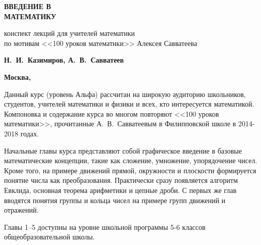 {\thispagestyle{empty}


\begin{flushright}
\quad

\vspace{2cm}

{\fontsize{100pt}{0pt}\bfseries\sffamily ВВЕДЕНИЕ В\\[20pt] МАТЕМАТИКУ}


\vspace{2cm}

{\fontsize{20pt}{22pt}\sffamily конспект лекций для учителей математики\\
по мотивам <<100 уроков математики>> Алексея Савватеева\\[5pt]
}

\vspace{2cm}

{\Large\bfseries\sffamily 	Н.~И.~Казимиров, А.~В.~Савватеев}

\vfill

{\Large\bfseries\sffamily 	Москва, \number\year}
\end{flushright}
}



\markboth{}{}

\clearpage
\renewcommand*\contentsname{\vspace{-20mm}\quad\hfill\Large\bfseries\sffamily\MakeUppercase{Содержание}\vspace{2mm}\textcolor{darkred}{\hrule}\thispagestyle{empty}}
\tableofcontents
 


Данный курс (уровень Альфа) рассчитан на широкую аудиторию школьников, студентов, учителей математики и физики и всех, кто интересуется математикой. Компоновка и содержание курса во многом повторяют <<100 уроков математики>>, прочитанные А.~В.~Савватеевым в Филипповской школе в 2014-2018 годах.

Начальные главы курса представляют собой графическое введение в базовые математические концепции, такие как сложение, умножение, упорядочение чисел. Кроме того, на примере движений прямой, окружности и плоскости формируется понятие числа как преобразования.
Практически сразу появляется алгоритм Евклида, основная теорема арифметики и цепные дроби.
С первых же глав вводятся понятия группы и кольца чисел на примере групп движений и отражений.

Главы 1--5 доступны на уровне школьной программы 5-6 классов общеобразовательной школы.

